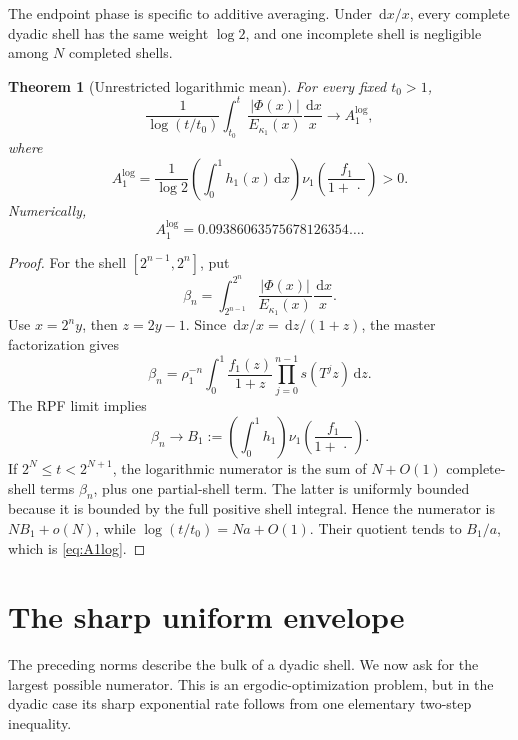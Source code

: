 \documentclass[11pt,oneside]{article}
\numberwithin{equation}{section}
\newtheorem{theorem}{Theorem}[section]
\theoremstyle{definition}
\theoremstyle{remark}
\newcommand{\dd}{\,\mathrm d}
\newcommand{\abs}[1]{\left|#1\right|}
\newcommand{\PhiUp}{\Phi}
\newcommand{\defeq}{\mathrel{:=}}
\begin{document}
The endpoint phase is specific to additive averaging.  Under \(\dd x/x\), every complete
dyadic shell has the same weight \(\log2\), and one incomplete shell is negligible among
\(N\) completed shells.

\begin{theorem}[Unrestricted logarithmic mean]
\label{thm:logarithmic-mean}
For every fixed \(t_0>1\),
\begin{equation}
 \frac1{\log(t/t_0)}\int_{t_0}^{t}
 \frac{\abs{\PhiUp(x)}}{E_{\kappa_1}(x)}\frac{\dd x}{x}
 \longrightarrow A_1^{\log},
 \label{eq:logarithmic-mean}
\end{equation}
where
\begin{equation}
 A_1^{\log}
 =\frac1{\log2}\left(\int_0^1h_1(x)\dd x\right)
 \nu_1\!\left(\frac{f_1}{1+\,\cdot\,}\right)>0.
 \label{eq:A1log}
\end{equation}
Numerically,
\begin{equation}
 A_1^{\log}=0.09386063575678126354\ldots .
 \label{eq:A1log-num}
\end{equation}
\end{theorem}

\begin{proof}
For the shell \([2^{n-1},2^n]\), put
\[
 \beta_n=\int_{2^{n-1}}^{2^n}
 \frac{\abs{\PhiUp(x)}}{E_{\kappa_1}(x)}\frac{\dd x}{x}.
\]
Use \(x=2^ny\), then \(z=2y-1\).  Since \(\dd x/x=\dd z/(1+z)\), the master
factorization gives
\begin{equation}
 \beta_n=\rho_1^{-n}\int_0^1
 \frac{f_1(z)}{1+z}\prod_{j=0}^{n-1}s(T^jz)\dd z.
 \label{eq:beta-n}
\end{equation}
The RPF limit implies
\[
 \beta_n\longrightarrow
 B_1\defeq\left(\int_0^1h_1\right)
 \nu_1\!\left(\frac{f_1}{1+\,\cdot\,}\right).
\]
If \(2^N\le t<2^{N+1}\), the logarithmic numerator is the sum of \(N+O(1)\) complete-shell
terms \(\beta_n\), plus one partial-shell term.  The latter is uniformly bounded because it
is bounded by the full positive shell integral.  Hence the numerator is
\(NB_1+o(N)\), while \(\log(t/t_0)=Na+O(1)\).  Their quotient tends to \(B_1/a\), which is
\eqref{eq:A1log}.
\end{proof}

\section{The sharp uniform envelope}
\label{sec:uniform}

The preceding norms describe the bulk of a dyadic shell.  We now ask for the largest
possible numerator.  This is an ergodic-optimization problem, but in the dyadic case its
sharp exponential rate follows from one elementary two-step inequality.
\end{document}
